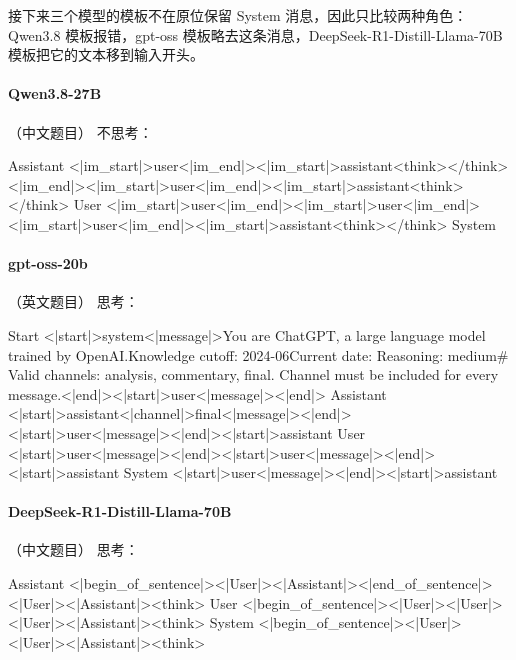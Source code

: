 接下来三个模型的模板不在原位保留 System 消息，因此只比较两种角色：Qwen3.8 模板报错，gpt-oss 模板略去这条消息，DeepSeek-R1-Distill-Llama-70B 模板把它的文本移到输入开头。

\paragraph{Qwen3.8-27B} （中文题目）
\noindent 不思考：
\begin{Rendering}
Assistant  <|im_start|>user\NL{}<|im_end|>\NL{}<|im_start|>assistant\NL{}<think>\NL{}\NL{}</think>\NL{}\NL{}<|im_end|>\NL{}<|im_start|>user\NL{}<|im_end|>\NL{}<|im_start|>assistant\NL{}<think>\NL{}\NL{}</think>\NL{}\NL{}
User       <|im_start|>user\NL{}<|im_end|>\NL{}<|im_start|>user\NL{}<|im_end|>\NL{}<|im_start|>user\NL{}<|im_end|>\NL{}<|im_start|>assistant\NL{}<think>\NL{}\NL{}</think>\NL{}\NL{}
System     
\end{Rendering}
\paragraph{gpt-oss-20b} （英文题目）
\noindent 思考：
\begin{Rendering}
Start      <|start|>system<|message|>You are ChatGPT, a large language model trained by OpenAI.\NL{}Knowledge cutoff: 2024-06\NL{}Current date: \NL{}\NL{}Reasoning: medium\NL{}\NL{}# Valid channels: analysis, commentary, final. Channel must be included for every message.<|end|><|start|>user<|message|><|end|>
Assistant  <|start|>assistant<|channel|>final<|message|><|end|><|start|>user<|message|><|end|><|start|>assistant
User       <|start|>user<|message|><|end|><|start|>user<|message|><|end|><|start|>assistant
System      <|start|>user<|message|><|end|><|start|>assistant
\end{Rendering}
\paragraph{DeepSeek-R1-Distill-Llama-70B} （中文题目）
\noindent 思考：
\begin{Rendering}
Assistant  <|begin_of_sentence|><|User|><|Assistant|><|end_of_sentence|><|User|><|Assistant|><think>\NL{}
User       <|begin_of_sentence|><|User|><|User|><|User|><|Assistant|><think>\NL{}
System      <|begin_of_sentence|><|User|><|User|><|Assistant|><think>\NL{}
\end{Rendering}

